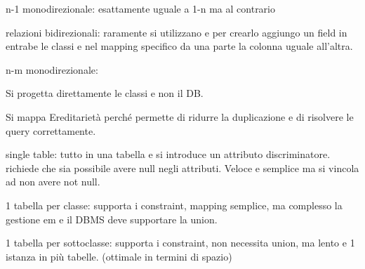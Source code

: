 n-1 monodirezionale: esattamente uguale a 1-n ma al contrario

relazioni bidirezionali: raramente si utilizzano e per crearlo aggiungo un field
in entrabe le classi e nel mapping specifico da una parte la colonna uguale all'altra.

n-m monodirezionale: 

Si progetta direttamente le classi e non il DB.

Si mappa Ereditarietà perché permette di ridurre la duplicazione e di risolvere
le query correttamente.

single table: tutto in una tabella e si introduce un attributo discriminatore.
richiede che sia possibile avere null negli attributi. Veloce e semplice ma 
si vincola ad non avere not null.

1 tabella per classe: supporta i constraint, mapping semplice, ma complesso la
gestione em e il DBMS deve supportare la union.

1 tabella per sottoclasse: supporta i constraint, non necessita union, ma lento
e 1 istanza in più tabelle. (ottimale in termini di spazio)